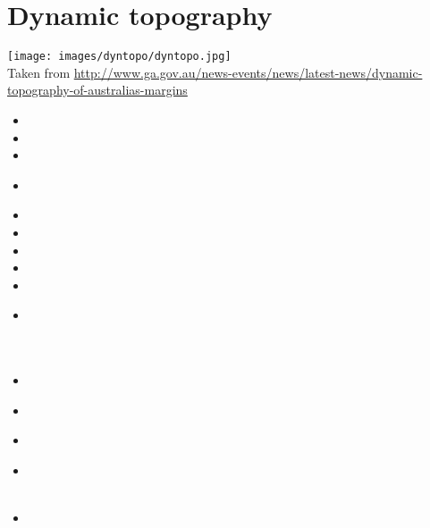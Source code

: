 \section{Dynamic topography} 

\begin{center}
\texttt{[image: images/dyntopo/dyntopo.jpg]}\\
{\captionfont Taken from \url{http://www.ga.gov.au/news-events/news/latest-news/dynamic-topography-of-australias-margins}}
\end{center}

\begin{scriptsize}
\begin{itemize}
\item[\nineteeneightyfive] 
\item[\nineteeneightyseven] 
\item[\nineteenninetytwo] 
\item[\nineteenninetythree] 
 \\
\item[\nineteenninetyseven] 
\item[\nineteenninetynine] 
\item[\twothousandthree] 
\item[\twothousandseven] 
\item[\twothousandnine] 
\item[\twothousandten] 
 \\
 \\
 \\
\item[\twothousandeleven] 
\item[\twothousandtwelve] 
 \\
\item[\twothousandthirteen] 
 \\
\item[\twothousandfifteen] 
 \\
 \\
\item[\twothousandsixteen] 

\end{itemize}
\end{scriptsize}
